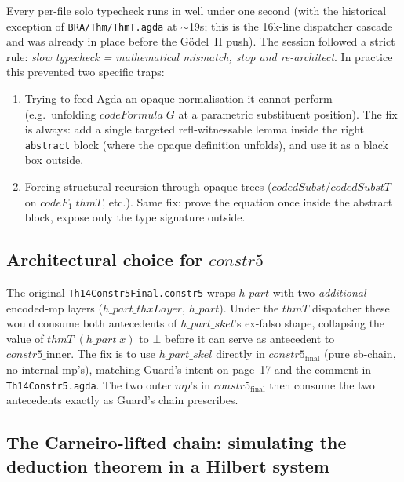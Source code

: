 \documentclass[11pt]{article}
\begin{document}
Every per-file solo typecheck runs in well under one second (with the
historical exception of \verb|BRA/Thm/ThmT.agda| at $\sim$19s; this is
the 16k-line dispatcher cascade and was already in place before the
G\"odel~II push).  The session followed a strict rule: \emph{slow
typecheck = mathematical mismatch, stop and re-architect}.  In
practice this prevented two specific traps:
\begin{enumerate}
  \item Trying to feed Agda an opaque normalisation it cannot perform
        (e.g.\ unfolding $\mathit{codeFormula}\;G$ at a parametric
        substituent position).  The fix is always: add a single
        targeted refl-witnessable lemma inside the right
        \verb|abstract| block (where the opaque definition unfolds),
        and use it as a black box outside.
  \item Forcing structural recursion through opaque trees
        ($\mathit{codedSubst} / \mathit{codedSubstT}$ on
        $\mathit{codeF}_1\;\mathit{thmT}$, etc.).  Same fix: prove the
        equation once inside the abstract block, expose only the
        type signature outside.
\end{enumerate}

\subsection{Architectural choice for $\mathit{constr5}$}

The original \verb|Th14Constr5Final.constr5| wraps $h\_\mathit{part}$
with two \emph{additional} encoded-mp layers
($h\_\mathit{part}\_\mathit{thxLayer}$, $h\_\mathit{part}$).  Under the
$\mathit{thmT}$ dispatcher these would consume both antecedents of
$h\_\mathit{part}\_\mathit{skel}$'s ex-falso shape, collapsing the value
of $\mathit{thmT}\;(h\_\mathit{part}\;x)$ to $\bot$ before it can serve
as antecedent to $\mathit{constr5}\_{\mathrm{inner}}$.  The fix is to
use $h\_\mathit{part}\_\mathit{skel}$ directly in
$\mathit{constr5}_{\mathrm{final}}$ (pure sb-chain, no internal mp's),
matching Guard's intent on page~17 and the comment in
\verb|Th14Constr5.agda|.  The two outer $\mathit{mp}$'s in
$\mathit{constr5}_{\mathrm{final}}$ then consume the two antecedents
exactly as Guard's chain prescribes.

\subsection{The Carneiro-lifted chain: simulating the deduction theorem in a Hilbert system}
\label{subsec:carneiro}
\end{document}
